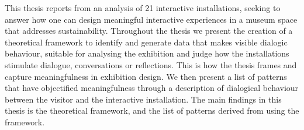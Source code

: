 This thesis reports from an analysis of 21 interactive installations, seeking to answer how one can design meaningful interactive experiences in a museum space that addresses sustainability. Throughout the thesis we present the creation of a theoretical framework to identify and generate data that makes visible dialogic behaviour, suitable for analysing the exhibition and judge how the installations stimulate dialogue, conversations or reflections. This is how the thesis frames and capture meaningfulness in exhibition design. We then present a list of patterns that have objectified meaningfulness through a description of dialogical behaviour between the visitor and the interactive installation. The main findings in this thesis is the theoretical framework, and the list of patterns derived from using the framework.